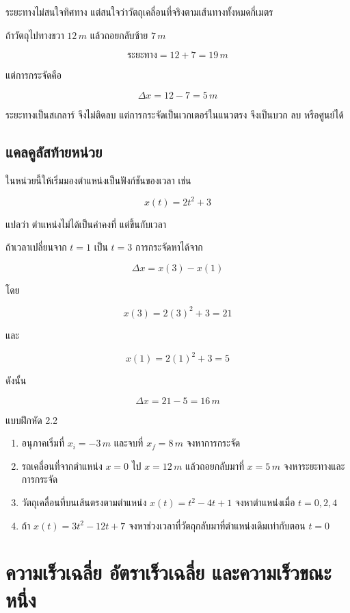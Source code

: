 \documentclass[12pt,a4paper]{report}
\begin{document}
ระยะทางไม่สนใจทิศทาง แต่สนใจว่าวัตถุเคลื่อนที่จริงตามเส้นทางทั้งหมดกี่เมตร

ถ้าวัตถุไปทางขวา $12\,\si{m}$ แล้วถอยกลับซ้าย $7\,\si{m}$

\[
\text{ระยะทาง}=12+7=19\,\si{m}
\]

แต่การกระจัดคือ

\[
\Delta x=12-7=5\,\si{m}
\]

\begin{tcolorbox}[title=ข้อควรระวัง]
ระยะทางเป็นสเกลาร์ จึงไม่ติดลบ แต่การกระจัดเป็นเวกเตอร์ในแนวตรง จึงเป็นบวก ลบ หรือศูนย์ได้
\end{tcolorbox}

\subsection{แคลคูลัสท้ายหน่วย}

ในหน่วยนี้ให้เริ่มมองตำแหน่งเป็นฟังก์ชันของเวลา เช่น

\[
x(t)=2t^2+3
\]

แปลว่า ตำแหน่งไม่ได้เป็นค่าคงที่ แต่ขึ้นกับเวลา

ถ้าเวลาเปลี่ยนจาก $t=1$ เป็น $t=3$ การกระจัดหาได้จาก

\[
\Delta x=x(3)-x(1)
\]

โดย

\[
x(3)=2(3)^2+3=21
\]

และ

\[
x(1)=2(1)^2+3=5
\]

ดังนั้น

\[
\Delta x=21-5=16\,\si{m}
\]

\begin{exercisebox}{แบบฝึกหัด 2.2}
\begin{enumerate}
    \item อนุภาคเริ่มที่ $x_i=-3\,\si{m}$ และจบที่ $x_f=8\,\si{m}$ จงหาการกระจัด
    \item รถเคลื่อนที่จากตำแหน่ง $x=0$ ไป $x=12\,\si{m}$ แล้วถอยกลับมาที่ $x=5\,\si{m}$ จงหาระยะทางและการกระจัด
    \item วัตถุเคลื่อนที่บนเส้นตรงตามตำแหน่ง $x(t)=t^2-4t+1$ จงหาตำแหน่งเมื่อ $t=0,2,4$
    \item ถ้า $x(t)=3t^2-12t+7$ จงหาช่วงเวลาที่วัตถุกลับมาที่ตำแหน่งเดิมเท่ากับตอน $t=0$
\end{enumerate}
\end{exercisebox}

\section{ความเร็วเฉลี่ย อัตราเร็วเฉลี่ย และความเร็วขณะหนึ่ง}
\end{document}
